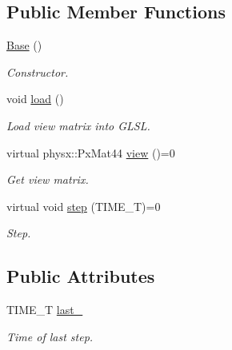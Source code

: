 \subsection*{\-Public \-Member \-Functions}
\begin{DoxyCompactItemize}
\item 
\hypertarget{classglutpp_1_1Camera_1_1View_1_1Base_ad3bde1a3cfcd829bf81724997fee91b5}{\hyperlink{classglutpp_1_1Camera_1_1View_1_1Base_ad3bde1a3cfcd829bf81724997fee91b5}{\-Base} ()}\label{classglutpp_1_1Camera_1_1View_1_1Base_ad3bde1a3cfcd829bf81724997fee91b5}

\begin{DoxyCompactList}\small\item\em \-Constructor. \end{DoxyCompactList}\item 
\hypertarget{classglutpp_1_1Camera_1_1View_1_1Base_a653df09aad239e1a24ba6d29e7a4cc42}{void \hyperlink{classglutpp_1_1Camera_1_1View_1_1Base_a653df09aad239e1a24ba6d29e7a4cc42}{load} ()}\label{classglutpp_1_1Camera_1_1View_1_1Base_a653df09aad239e1a24ba6d29e7a4cc42}

\begin{DoxyCompactList}\small\item\em \-Load view matrix into \-G\-L\-S\-L. \end{DoxyCompactList}\item 
\hypertarget{classglutpp_1_1Camera_1_1View_1_1Base_a5f7e27817005dd4d75e15d00ae58cb68}{virtual physx\-::\-Px\-Mat44 \hyperlink{classglutpp_1_1Camera_1_1View_1_1Base_a5f7e27817005dd4d75e15d00ae58cb68}{view} ()=0}\label{classglutpp_1_1Camera_1_1View_1_1Base_a5f7e27817005dd4d75e15d00ae58cb68}

\begin{DoxyCompactList}\small\item\em \-Get view matrix. \end{DoxyCompactList}\item 
virtual void \hyperlink{classglutpp_1_1Camera_1_1View_1_1Base_a92154fdd1ef6a972cf5d38c51aea616a}{step} (\-T\-I\-M\-E\-\_\-\-T)=0
\begin{DoxyCompactList}\small\item\em \-Step. \end{DoxyCompactList}\end{DoxyCompactItemize}
\subsection*{\-Public \-Attributes}
\begin{DoxyCompactItemize}
\item 
\hypertarget{classglutpp_1_1Camera_1_1View_1_1Base_a541a8a64ac1ad4ee8cd03482232f1773}{\-T\-I\-M\-E\-\_\-\-T \hyperlink{classglutpp_1_1Camera_1_1View_1_1Base_a541a8a64ac1ad4ee8cd03482232f1773}{last\-\_\-}}\label{classglutpp_1_1Camera_1_1View_1_1Base_a541a8a64ac1ad4ee8cd03482232f1773}

\begin{DoxyCompactList}\small\item\em \-Time of last step. \end{DoxyCompactList}\end{DoxyCompactItemize}


